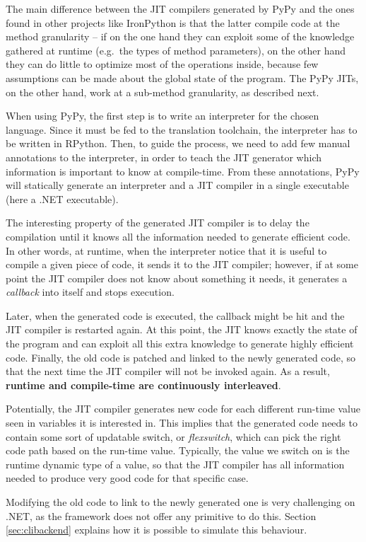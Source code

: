 The main difference between the JIT compilers generated by PyPy and the
ones found in other projects like IronPython is that the latter compile
code at the method granularity -- if on the one hand they can exploit
some of the knowledge gathered at runtime (e.g.\ the types of method
parameters), on the other hand they can do little to optimize most of
the operations inside, because few assumptions can be made about the
global state of the program.  The PyPy JITs, on the other hand, work at
a sub-method granularity, as described next.

When using PyPy, the first step is to write an interpreter for the chosen language.  Since it
must be fed to the translation toolchain, the interpreter has to be written in
RPython.  Then, to guide the process, we need to add few manual
annotations to the interpreter, in order to teach the JIT generator which
information is important to know at compile-time.  
From these annotations, PyPy will statically generate an interpreter and a JIT
compiler in a single executable (here a .NET executable).

The interesting property of the generated JIT compiler is to delay the
compilation until it knows all the information needed to generate
efficient code.  In other words, at runtime, when the interpreter notice
that it is useful to compile a given piece of code, it sends it to the
JIT compiler; however, if at some point the JIT compiler does not know
about something it needs, it generates a \emph{callback} into itself and stops
execution.

Later, when the generated code is executed, the callback might be hit and the JIT
compiler is restarted again.  At this point, the JIT knows exactly the state
of the program and can exploit all this extra knowledge to generate highly
efficient code.  Finally, the old code is patched and linked to the newly
generated code, so that the next time the JIT compiler will not be invoked
again.  As a result, \textbf{runtime and compile-time are continuously
interleaved}. 

Potentially, the JIT compiler generates new code for each different run-time
value seen in variables it is interested in.
This implies that the generated code needs to contain some sort of updatable
switch, or \emph{flexswitch}, which can pick the right code path based on the
run-time value.  Typically, the value we switch on is the runtime dynamic type
of a value, so that the JIT compiler has all information needed to produce
very good code for that specific case.

Modifying the old code to link to the newly generated one is very challenging on
.NET, as the framework does not offer any primitive to do this.  Section
\ref{sec:clibackend} explains how it is possible to simulate this behaviour.

